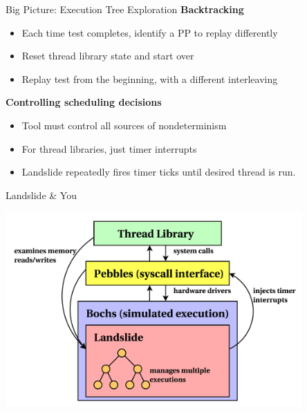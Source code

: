 \documentclass[xcolor=dvipsnames]{beamer}
\begin{document}
\begin{frame}{Big Picture: Execution Tree Exploration}
	\textbf{Backtracking}
	\begin{itemize}
		\item Each time test completes, identify a PP to replay differently
		\item Reset thread library state and start over
		\item Replay test from the beginning, with a different interleaving
	\end{itemize}
	\pause
	\linegap

	{\bf Controlling scheduling decisions}
	\begin{itemize}
		\item Tool must control all sources of nondeterminism
		\item For thread libraries, just timer interrupts
		\item Landslide repeatedly fires timer ticks until desired thread is run.
	\end{itemize}
\end{frame}


\begin{frame}{Landslide \& You}
	\begin{center}
	\includegraphics[width=0.85\textwidth]{landslide-new.pdf}
	\end{center}
\end{frame}
\end{document}
